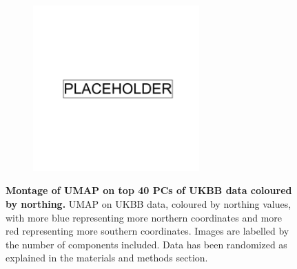 \begin{figure}
    \centering
    \begin{subfigure}{0.95\textwidth}
    \includegraphics[width=0.7\textwidth]{placeholder.png}
    \end{subfigure}
    \caption[Montage of UMAP on top 40 PCs of UKBB data coloured by northing]{\textbf{Montage of UMAP on top 40 PCs of UKBB data coloured by northing.} UMAP on UKBB data, coloured by northing values, with more blue representing more northern coordinates and more red representing more southern coordinates. Images are labelled by the number of components included. Data has been randomized as explained in the materials and methods section.}
    \label{fig:supp_montage_ukbb_ns}
\end{figure}

\newpage

